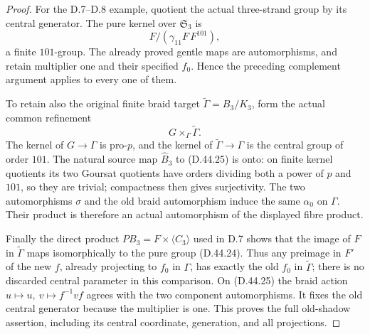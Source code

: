 \begin{proof}
For the D.7--D.8 example,
quotient the actual three-strand
group by its central
generator.
The pure kernel over
\(\mathfrak S_3\) is
\[
                 F/(\gamma_{11}F\,F^{101}),
 \tag{D.44.24}
\]
a finite \(101\)-group.
The already proved gentle
maps are automorphisms,
and retain multiplier one
and their specified \(f_0\).
Hence the preceding complement
argument applies to every
one of them.

To retain also the original
finite braid target
\(\widetilde\Gamma=B_3/K_3\),
form the actual common
refinement
\[
             G\mathbin{\times_\Gamma}
                         \widetilde\Gamma .
 \tag{D.44.25}
\]
The kernel of \(G\to\Gamma\)
is pro-\(p\), and the
kernel of
\(\widetilde\Gamma\to\Gamma\)
is the central group of
order \(101\).
The natural source map
\(\widehat B_3\) to
\textup{(D.44.25)} is onto:
on finite kernel quotients
its two Goursat quotients
have orders dividing
both a power of \(p\)
and \(101\), so they
are trivial; compactness
then gives surjectivity.
The two automorphisms
\(\sigma\) and the old
braid automorphism induce
the same \(\alpha_0\)
on \(\Gamma\).
Their product is therefore
an actual automorphism
of the displayed fibre
product.

Finally the direct product
\(PB_3=F\times\langle C_3\rangle\)
used in D.7 shows that
the image of \(F\) in
\(\widetilde\Gamma\) maps
isomorphically to the
pure group
\textup{(D.44.24)}.
Thus any preimage in \(F'\)
of the new \(f\), already
projecting to \(f_0\) in
\(\Gamma\), has exactly
the old \(f_0\) in
\(\widetilde\Gamma\);
there is no discarded
central parameter in
this comparison.
On \textup{(D.44.25)}
the braid action
\(u\mapsto u,\ v\mapsto f^{-1}vf\)
agrees with the two
component automorphisms.
It fixes the old central
generator because the
multiplier is one.
This proves the full
old-shadow assertion,
including its central
coordinate, generation,
and all projections.


\end{proof}
